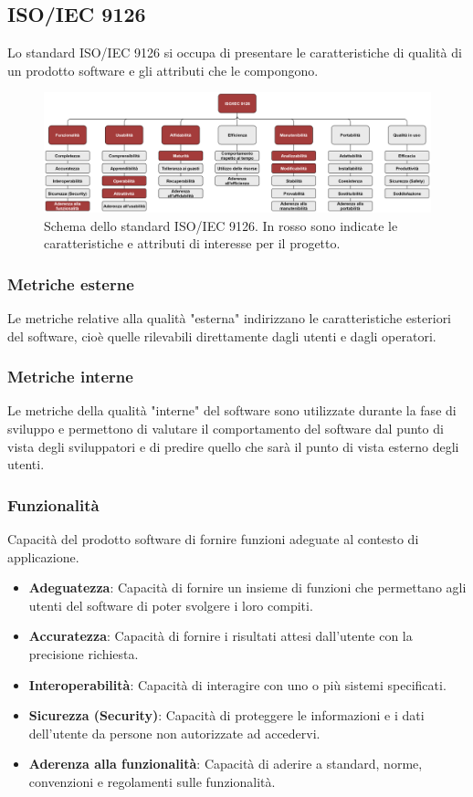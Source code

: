\subsection{ISO/IEC 9126}
Lo standard ISO/IEC 9126 si occupa di presentare le caratteristiche di qualità di un prodotto software e gli attributi che le compongono.

\begin{figure}[h]
    \centering
    \includegraphics[scale=0.53]{Immagini/IsoIec9126.png}
    \caption{Schema dello standard ISO/IEC 9126. In rosso sono indicate le caratteristiche e attributi di interesse per il progetto.}
\end{figure}

\subsubsection{Metriche esterne}
Le metriche relative alla qualità "esterna" indirizzano le caratteristiche esteriori del software, cioè quelle rilevabili direttamente dagli utenti e dagli operatori.

\subsubsection{Metriche interne}
 Le metriche della qualità "interne" del software sono utilizzate durante la fase di sviluppo e permettono di valutare il comportamento del software dal punto di vista degli sviluppatori e di predire quello che sarà il punto di vista esterno degli utenti.

\subsubsection{Funzionalità}
Capacità del prodotto software di fornire funzioni adeguate al contesto di applicazione.
\begin{itemize}
\item \textbf{Adeguatezza}: Capacità di fornire un insieme di funzioni che permettano agli utenti del software di poter svolgere i loro compiti.
\item \textbf{Accuratezza}: Capacità di fornire i risultati attesi dall’utente con la precisione richiesta.
\item \textbf{Interoperabilità}: Capacità di interagire con uno o più sistemi specificati.
\item \textbf{Sicurezza (Security)}: Capacità di proteggere le informazioni e i dati dell’utente da persone non autorizzate ad accedervi.
\item \textbf{Aderenza alla funzionalità}: Capacità di aderire a standard, norme, convenzioni e regolamenti sulle funzionalità.
\end{itemize}

